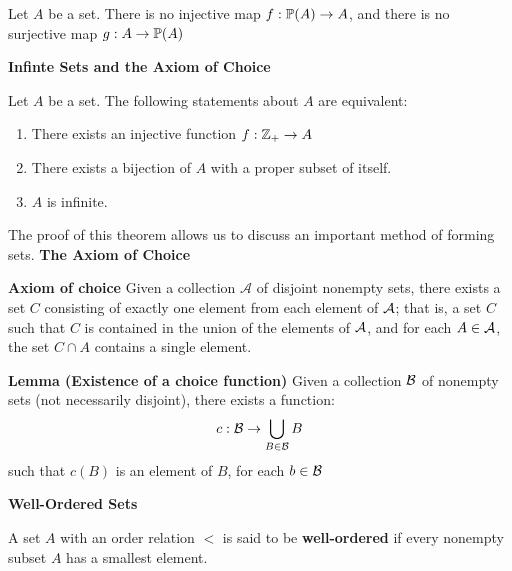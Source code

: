 \begin{thm}
	Let $ A $ be a set. There is no injective map $ f : \mathbb{P}(A)  \rightarrow A $, and there is no surjective map $ g : A \rightarrow \mathbb{P}(A) $
\end{thm}

\textbf{\LARGE Infinte Sets and the Axiom of Choice}

\begin{thm}
	Let $A$ be a set. The following statements about $A$ are equivalent:
	\begin{enumerate}
		\item There exists an injective function $ f : \mathbb{Z}_+ \rightarrow A $
		\item There exists a bijection of $A$ with a proper subset of itself.
		\item $A$ is infinite.
	\end{enumerate}
\end{thm}

The proof of this theorem allows us to discuss an important method of forming sets. \textbf{The Axiom of Choice}

\textbf{Axiom of choice} Given a collection $ \mathcal{A} $ of disjoint nonempty sets, there exists a set $ C $ consisting of exactly one element from each element of $ \mathcal{A} $; that is, a set $C$ such that $C$ is contained in the union of the elements of  $ \mathcal{A} $, and for each $ A \in \mathcal{A} $, the set $C \cap A$ contains a single element.

\textbf{Lemma (Existence of a choice function)} Given a collection $ \mathcal{B} $ of nonempty sets (not necessarily disjoint), there exists a function:
\[ c : \mathcal{B} \rightarrow \bigcup_{B \in \mathcal{B}}B \]
such that $ c(B) $ is an element of $B$, for each $b \in \mathcal{B}$

\textbf{\LARGE Well-Ordered Sets}

\begin{defn}
	A set $A$ with an order relation $ < $ is said to be \textbf{well-ordered} if every nonempty subset $A$ has a smallest element.
\end{defn}